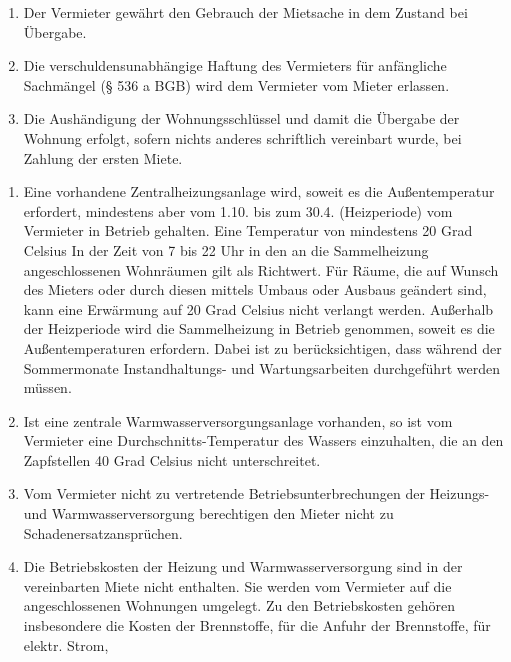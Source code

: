 \documentclass{scrreprt}[12pt,a4paper,twoside,duplex]
\begin{document}
\begin{contract}
\begin{enumerate}
  \item Der Vermieter gewährt den Gebrauch der Mietsache in dem Zustand bei
  Übergabe.
  \item Die verschuldensunabhängige Haftung des Vermieters für anfängliche
  Sachmängel (§ 536 a BGB) wird dem Vermieter vom Mieter erlassen.
  \item Die Aushändigung der Wohnungsschlüssel und damit die Übergabe der
  Wohnung erfolgt, sofern nichts anderes schriftlich vereinbart wurde, bei
  Zahlung der ersten Miete.
\end{enumerate}
\end{contract}

\begin{contract}
\label{sammelHeizungUndWarmwasserversorgung}
\begin{enumerate}
  \item Eine vorhandene Zentralheizungsanlage wird, soweit es die
  Außentemperatur erfordert, mindestens aber vom 1.10. bis zum 30.4.
  (Heizperiode) vom Vermieter in Betrieb gehalten. Eine Temperatur von
  mindestens 20 Grad Celsius In der Zeit von 7 bis 22 Uhr in den an die
  Sammelheizung angeschlossenen Wohnräumen gilt als Richtwert. Für Räume, die
  auf Wunsch des Mieters oder durch diesen mittels Umbaus oder Ausbaus geändert
  sind, kann eine Erwärmung auf 20 Grad Celsius nicht verlangt werden. Außerhalb
  der Heizperiode wird die Sammelheizung in Betrieb genommen, soweit es die
  Außentemperaturen erfordern. Dabei ist zu berücksichtigen, dass während der
  Sommermonate Instandhaltungs- und Wartungsarbeiten durchgeführt werden müssen.
  \item Ist eine zentrale Warmwasserversorgungsanlage vorhanden, so ist vom
  Vermieter eine Durchschnitts-Temperatur des Wassers einzuhalten, die an den
  Zapfstellen 40 Grad Celsius nicht unterschreitet.
  \item Vom Vermieter nicht zu vertretende Betriebsunterbrechungen der Heizungs-
  und Warmwasserversorgung berechtigen den Mieter nicht zu
  Schadenersatzansprüchen.
  \item Die Betriebskosten der Heizung und Warmwasserversorgung sind in der
  vereinbarten Miete nicht enthalten. Sie werden vom Vermieter auf die
  angeschlossenen Wohnungen umgelegt. Zu den Betriebskosten gehören insbesondere
  die Kosten der Brennstoffe, für die Anfuhr der Brennstoffe, für elektr. Strom,

\end{enumerate}
\end{contract}
\end{document}
